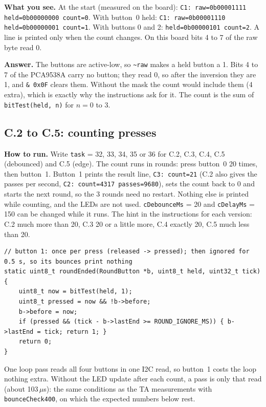 \documentclass[11pt,a4paper]{article}
\newcommand{\lv}[1]{\texttt{#1}}                 %
\newcommand{\run}[1]{\textbf{How to run.} #1}
\newcommand{\see}[1]{\textbf{What you see.} #1}
\begin{document}
\see{At the start (measured on the board): \texttt{C1: raw=0b00001111 held=0b00000000 count=0}. With button~0
held: \texttt{C1: raw=0b00001110 held=0b00000001 count=1}. With buttons 0 and 2: \texttt{held=0b00000101 count=2}. A
line is printed only when the count changes. On this board bits 4 to 7 of the raw byte read 0.}

\textbf{Answer.} The buttons are active-low, so \texttt{\textasciitilde raw} makes a held button a 1. Bits 4 to 7 of
the PCA9538A carry no button; they read 0, so after the inversion they are 1, and \texttt{\& 0x0F} clears them.
Without the mask the count would include them (4 extra), which is exactly why the instructions ask for it. The count is
the sum of \texttt{bitTest(held, n)} for $n = 0$ to 3.

\subsection*{C.2 to C.5: counting presses}
\run{Write \lv{task} = 32, 33, 34, 35 or 36 for C.2, C.3, C.4, C.5 (debounced) and C.5 (edge). The count runs in
rounds: press button~0 20 times, then button~1. Button~1 prints the result line, \texttt{C3: count=21} (C.2 also gives
the passes per second, \texttt{C2: count=4317 passes=9680}), sets the count back to 0 and starts the next round, so the
3 rounds need no restart. Nothing else is printed while counting, and the LEDs are not used. \lv{cDebounceMs} = 20 and
\lv{cDelayMs} = 150 can be changed while it runs. The hint in the instructions for each version: C.2 much more than
20, C.3 20 or a little more, C.4 exactly 20, C.5 much less than 20.}

\begin{lstlisting}
// button 1: once per press (released -> pressed); then ignored for 0.5 s, so its bounces print nothing
static uint8_t roundEnded(RoundButton *b, uint8_t held, uint32_t tick)
{
    uint8_t now = bitTest(held, 1);
    uint8_t pressed = now && !b->before;
    b->before = now;
    if (pressed && (tick - b->lastEnd >= ROUND_IGNORE_MS)) { b->lastEnd = tick; return 1; }
    return 0;
}
\end{lstlisting}
One loop pass reads all four buttons in one I2C read, so button~1 costs the loop nothing extra. Without the LED
update after each count, a pass is only that read (about 103\,$\mu$s): the same conditions as the TA measurements with
\texttt{bounceCheck400}, on which the expected numbers below rest.
\end{document}
